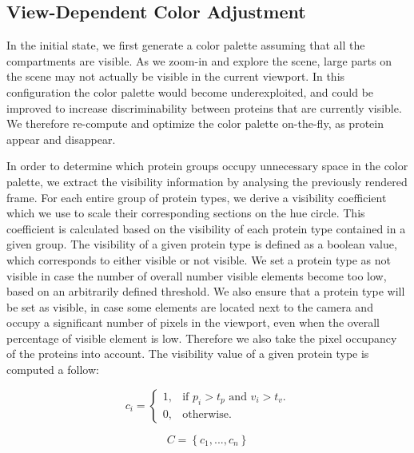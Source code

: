 \documentclass[review,journal]{vgtc}         %
\begin{document}
	
	\subsection{View-Dependent Color Adjustment}
	\label{sec:dynamic}
	
	In the initial state, we first generate a color palette assuming that all the compartments are visible.
	As we zoom-in and explore the scene, large parts on the scene may not actually be visible in the current viewport.
	In this configuration the color palette would become underexploited, and could be improved to increase discriminability between proteins that are currently visible. 
	We therefore re-compute and optimize the color palette on-the-fly, as protein appear and disappear.
			 
	In order to determine which protein groups occupy unnecessary space in the color palette, we extract the visibility information by analysing the previously rendered frame.
	For each entire group of protein types, we derive a visibility coefficient which we use to scale their corresponding sections on the hue circle. 
	This coefficient is calculated based on the visibility of each protein type contained in a given group.
	The visibility of a given protein type is defined as a boolean value, which corresponds to either visible or not visible.
	We set a protein type as not visible in case the number of overall number visible elements become too low, based on an arbitrarily defined threshold.
	We also ensure that a protein type will be set as visible, in case some elements are located next to the camera and occupy a significant number of pixels in the viewport, even when the overall percentage of visible element is low.
	Therefore we also take the pixel occupancy of the proteins into account.
	The visibility value of a given protein type is computed a follow:
	
	\begin{equation}
	c_{i}=\begin{cases}
	1, & \text{if $p_{i}>t_{p}$ and $v_{i}>t_{v}$}.\\
	0, & \text{otherwise}.
	\end{cases}
	\end{equation}
	
	\begin{equation}
	C = \left\lbrace c_{1}, ... , c_{n} \right\rbrace 
	\end{equation}
	
\end{document}
